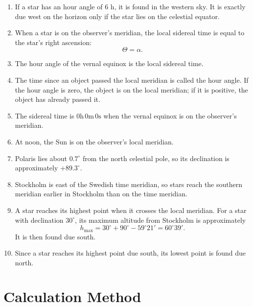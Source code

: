\documentclass[a4paper,11pt]{article}
\begin{document}
\begin{enumerate}[label=\textbf{\arabic*.}, leftmargin=*]
    \item If a star has an hour angle of 6 h, it is found in the western sky. It is exactly due west on the horizon only if the star lies on the celestial equator.

    \item When a star is on the observer's meridian, the local sidereal time is equal to the star's right ascension:
    \[
        \Theta = \alpha.
    \]

    \item The hour angle of the vernal equinox is the local sidereal time.

    \item The time since an object passed the local meridian is called the hour angle. If the hour angle is zero, the object is on the local meridian; if it is positive, the object has already passed it.

    \item The sidereal time is $0\mathrm{h}\,0\mathrm{m}\,0\mathrm{s}$ when the vernal equinox is on the observer's meridian.

    \item At noon, the Sun is on the observer's local meridian.

    \item Polaris lies about $0.7^\circ$ from the north celestial pole, so its declination is approximately $+89.3^\circ$.

    \item Stockholm is east of the Swedish time meridian, so stars reach the southern meridian earlier in Stockholm than on the time meridian.

    \item A star reaches its highest point when it crosses the local meridian. For a star with declination $30^\circ$, its maximum altitude from Stockholm is approximately
    \[
        h_{\max} = 30^\circ + 90^\circ - 59^\circ 21' = 60^\circ 39'.
    \]
    It is then found due south.

    \item Since a star reaches its highest point due south, its lowest point is found due north.
\end{enumerate}

\section{Calculation Method}
\label{sec:method}
\end{document}
